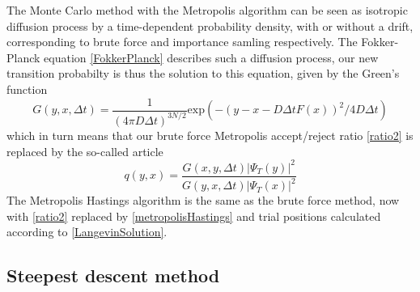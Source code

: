 \documentclass[english, a4paper]{article}
\begin{document}
\noindent The Monte Carlo method with the Metropolis algorithm can be seen as isotropic diffusion process 
by a time-dependent 
probability density, with or without a drift, corresponding to brute force and importance samling respectively.
The Fokker-Planck equation \eqref{FokkerPlanck} describes such a diffusion process, our
new transition probabilty is thus the solution to this equation, given by the Green's function
\begin{equation}
 G(y, x, \Delta t) = \frac{1}{(4\pi D \Delta t)^{3N/2}}
 \textrm{exp}(-(y - x - D\Delta t F(x))^2 / 4D\Delta t)
\end{equation}
which in turn means that our brute force Metropolis accept/reject ratio \eqref{ratio2} is replaced by
the so-called  article
\begin{equation}
 q(y, x) = \frac{G(x, y, \Delta t)|\Psi_T(y)|^2}{G(y, x, \Delta t)|\Psi_T(x)|^2}
 \label{metropolisHastings}
\end{equation}
The Metropolis Hastings algorithm is the same as the brute force method, now with \eqref{ratio2} replaced by 
\eqref{metropolisHastings} and trial positions
calculated according to \eqref{LangevinSolution}.

\subsection{Steepest descent method}
\end{document}

